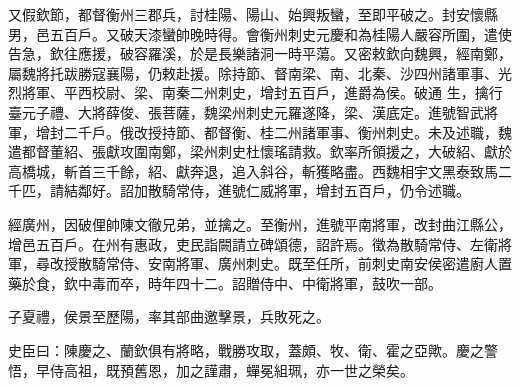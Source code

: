 \begin{pinyinscope}
 又假欽節，都督衡州三郡兵，討桂陽、陽山、始興叛蠻，至即平破之。封安懷縣男，邑五百戶。又破天漆蠻帥晚時得。會衡州刺史元慶和為桂陽人嚴容所圍，遣使告急，欽往應援，破容羅溪，於是長樂諸洞一時平蕩。又密敕欽向魏興，經南鄭，屬魏將托跋勝寇襄陽，仍敕赴援。除持節、督南梁、南、北秦、沙四州諸軍事、光烈將軍、平西校尉、梁、南秦二州刺史，增封五百戶，進爵為侯。破通
 生，擒行臺元子禮、大將薛俊、張菩薩，魏梁州刺史元羅遂降，梁、漢底定。進號智武將軍，增封二千戶。俄改授持節、都督衡、桂二州諸軍事、衡州刺史。未及述職，魏遣都督董紹、張獻攻圍南鄭，梁州刺史杜懷瑤請救。欽率所領援之，大破紹、獻於高橋城，斬首三千餘，紹、獻奔退，追入斜谷，斬獲略盡。西魏相宇文黑泰致馬二千匹，請結鄰好。詔加散騎常侍，進號仁威將軍，增封五百戶，仍令述職。



 經廣州，因破俚帥陳文徹兄弟，並擒之。至衡州，進號平南將軍，改封曲江縣公，增邑五百戶。在州有惠政，吏民詣闕請立碑頌德，詔許焉。徵為散騎常侍、左衛將
 軍，尋改授散騎常侍、安南將軍、廣州刺史。既至任所，前刺史南安侯密遣廚人置藥於食，欽中毒而卒，時年四十二。詔贈侍中、中衛將軍，鼓吹一部。



 子夏禮，侯景至歷陽，率其部曲邀擊景，兵敗死之。



 史臣曰：陳慶之、蘭欽俱有將略，戰勝攻取，蓋頗、牧、衛、霍之亞歟。慶之警悟，早侍高祖，既預舊恩，加之謹肅，蟬冕組珮，亦一世之榮矣。



\end{pinyinscope}